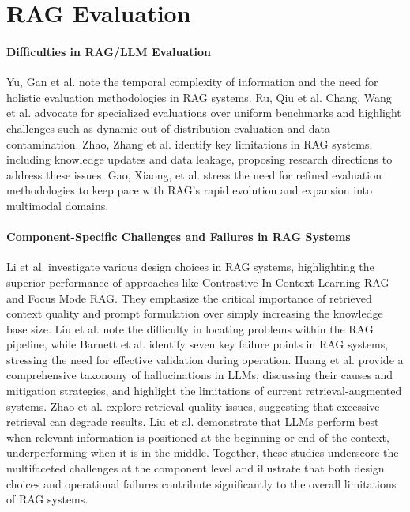 \section{RAG Evaluation}

\paragraph{Difficulties in RAG/LLM Evaluation}
Yu, Gan et al.\cite{Yu.2024} note the temporal complexity of information and the need for holistic evaluation methodologies in RAG systems. Ru, Qiu et al. Chang, Wang et al.\cite{Chang.06.07.2023} advocate for specialized evaluations over uniform benchmarks and highlight challenges such as dynamic out-of-distribution evaluation and data contamination. Zhao, Zhang et al.\cite{Zhao.29.02.2024} identify key limitations in RAG systems, including knowledge updates and data leakage, proposing research directions to address these issues. Gao, Xiaong, et al.\cite{Gao.18.12.2023} stress the need for refined evaluation methodologies to keep pace with RAG's rapid evolution and expansion into multimodal domains. 

\paragraph{Component-Specific Challenges and Failures in RAG Systems}
Li et al.\cite{Li.13.01.2025} investigate various design choices in RAG systems, highlighting the superior performance of approaches like Contrastive In-Context Learning RAG and Focus Mode RAG. They emphasize the critical importance of retrieved context quality and prompt formulation over simply increasing the knowledge base size. Liu et al.\cite{JintaoLiu.2024} note the difficulty in locating problems within the RAG pipeline, while Barnett et al.\cite{Barnett.2024} identify seven key failure points in RAG systems, stressing the need for effective validation during operation. Huang et al.\cite{Huang.2023} provide a comprehensive taxonomy of hallucinations in LLMs, discussing their causes and mitigation strategies, and highlight the limitations of current retrieval-augmented systems. Zhao et al.\cite{Zhao.29.02.2024} explore retrieval quality issues, suggesting that excessive retrieval can degrade results. Liu et al.\cite{Liu.06.07.2023} demonstrate that LLMs perform best when relevant information is positioned at the beginning or end of the context, underperforming when it is in the middle. Together, these studies underscore the multifaceted challenges at the component level and illustrate that both design choices and operational failures contribute significantly to the overall limitations of RAG systems.


